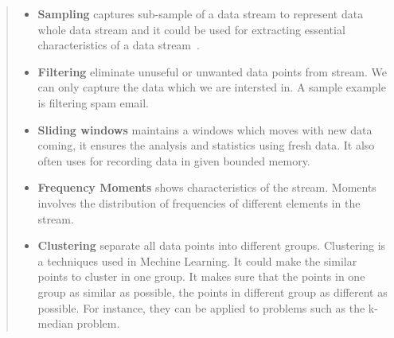 \begin{quote}
\begin{itemize}
    \item  \textbf{Sampling} captures sub-sample of a data stream to represent
    data whole data stream and it could be used for extracting essential
    characteristics of a data stream~\cite{kejariwal2015real}.
    
    \item \textbf{Filtering} eliminate unuseful or unwanted data points from
    stream. We can only capture the data which we are intersted in. A sample
    example is filtering spam email.
    
    \item \textbf{Sliding windows} maintains a windows which moves with new data
    coming, it ensures the analysis and statistics using fresh data. It also 
    often uses for recording data in given bounded memory.

    \item \textbf{Frequency Moments} shows characteristics of the stream.
    Moments involves the distribution of frequencies of different elements in
    the stream. 
    
    
    \item \textbf{Clustering} separate all data points into different groups.
    Clustering is a techniques used in Mechine Learning. It could make the 
    similar points to cluster in one group. It makes sure that the points in one
    group as similar as possible, the points in different group as different as
    possible. For instance, they can be applied to problems such as the k-median 
    problem. 
    

\end{itemize}
\end{quote}
